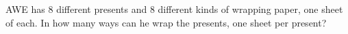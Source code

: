 AWE has $8$ different presents and $8$ different kinds of wrapping paper, one sheet of each. In how many ways can he wrap the presents, one sheet per present?
